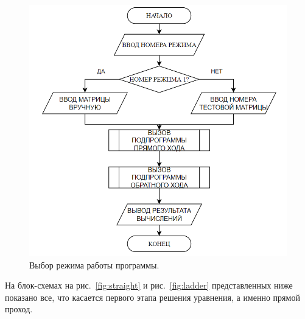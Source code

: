 \documentclass{altsu-bachelor}
\begin{document}
\begin{figure}[H]
    \centering
    \includegraphics[scale=0.8]{main.png}
    \caption{Выбор режима работы программы.}
    \label{fig:main}
\end{figure}

На блок-схемах на рис.~\ref{fig:straight} и рис.~\ref{fig:ladder} представленных ниже показано все, что касается первого этапа решения уравнения, а именно прямой проход.
\end{document}
